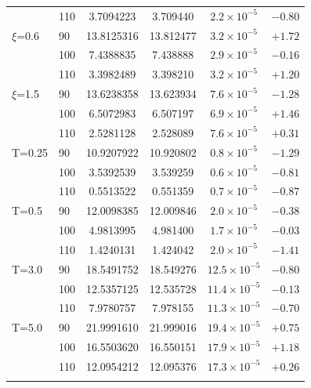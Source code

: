 \begin{table}[h]
\begin{tabular}{llcccr}
 & 110 & 3.7094223 & 3.709440 & $2.2\times10^{-5}$ & $-0.80$\\
\addlinespace[2pt]
$\xi$=0.6 & 90 & 13.8125316 & 13.812477 & $3.2\times10^{-5}$ & $+1.72$\\
 & 100 & 7.4388835 & 7.438888 & $2.9\times10^{-5}$ & $-0.16$\\
 & 110 & 3.3982489 & 3.398210 & $3.2\times10^{-5}$ & $+1.20$\\
\addlinespace[2pt]
$\xi$=1.5 & 90 & 13.6238358 & 13.623934 & $7.6\times10^{-5}$ & $-1.28$\\
 & 100 & 6.5072983 & 6.507197 & $6.9\times10^{-5}$ & $+1.46$\\
 & 110 & 2.5281128 & 2.528089 & $7.6\times10^{-5}$ & $+0.31$\\
\addlinespace[2pt]
T=0.25 & 90 & 10.9207922 & 10.920802 & $0.8\times10^{-5}$ & $-1.29$\\
 & 100 & 3.5392539 & 3.539259 & $0.6\times10^{-5}$ & $-0.81$\\
 & 110 & 0.5513522 & 0.551359 & $0.7\times10^{-5}$ & $-0.87$\\
\addlinespace[2pt]
T=0.5 & 90 & 12.0098385 & 12.009846 & $2.0\times10^{-5}$ & $-0.38$\\
 & 100 & 4.9813995 & 4.981400 & $1.7\times10^{-5}$ & $-0.03$\\
 & 110 & 1.4240131 & 1.424042 & $2.0\times10^{-5}$ & $-1.41$\\
\addlinespace[2pt]
T=3.0 & 90 & 18.5491752 & 18.549276 & $12.5\times10^{-5}$ & $-0.80$\\
 & 100 & 12.5357125 & 12.535728 & $11.4\times10^{-5}$ & $-0.13$\\
 & 110 & 7.9780757 & 7.978155 & $11.3\times10^{-5}$ & $-0.70$\\
\addlinespace[2pt]
T=5.0 & 90 & 21.9991610 & 21.999016 & $19.4\times10^{-5}$ & $+0.75$\\
 & 100 & 16.5503620 & 16.550151 & $17.9\times10^{-5}$ & $+1.18$\\
 & 110 & 12.0954212 & 12.095376 & $17.3\times10^{-5}$ & $+0.26$\\
\addlinespace[2pt]
\bottomrule
\end{tabular}
\end{table}

